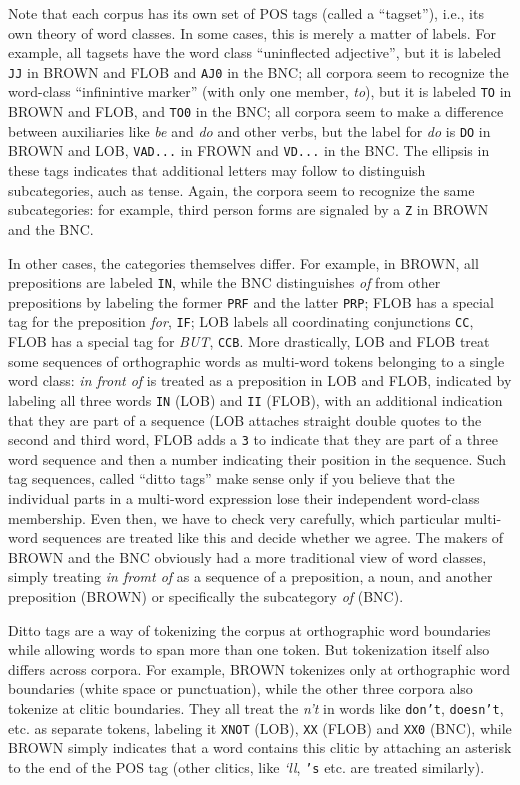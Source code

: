 Note that each corpus has its own set of POS tags (called a ``tagset''), i.e., its own theory of word classes. In some cases, this is merely a matter of labels. For example, all tagsets have the word class ``uninflected adjective'', but it is labeled \texttt{JJ} in BROWN and FLOB and \texttt{AJ0} in the BNC; all corpora seem to recognize the word-class ``infinintive marker'' (with only one member, \textit{to}), but it is labeled \texttt{TO} in BROWN and FLOB, and \texttt{TO0} in the BNC; all corpora seem to make a difference between auxiliaries like \textit{be} and \textit{do} and other verbs, but the label for \textit{do} is \texttt{DO} in BROWN and LOB, \texttt{VAD...} in FROWN and \texttt{VD...} in the BNC. The ellipsis in these tags indicates that additional letters may follow to distinguish subcategories, auch as tense. Again, the corpora seem to recognize the same subcategories: for example, third person forms are signaled by a \texttt{Z} in BROWN and the BNC.

In other cases, the categories themselves differ. For example, in BROWN, all prepositions are labeled \texttt{IN}, while the BNC distinguishes \textit{of} from other prepositions by labeling the former \texttt{PRF} and the latter \texttt{PRP}; FLOB has a special tag for the preposition \textit{for}, \texttt{IF}; LOB labels all coordinating conjunctions \texttt{CC}, FLOB has a special tag for \textit{BUT}, \texttt{CCB}. More drastically, LOB and FLOB treat some sequences of orthographic words as multi-word tokens belonging to a single word class: \textit{in front of} is treated as a preposition in LOB and FLOB, indicated by labeling all three words \texttt{IN} (LOB) and \texttt{II} (FLOB), with an additional indication that they are part of a sequence (LOB attaches straight double quotes to the second and third word, FLOB adds a \texttt{3} to indicate that they are part of a three word sequence and then a number indicating their position in the sequence. Such tag sequences, called ``ditto tags'' make sense only if you believe that the individual parts in a multi-word expression lose their independent word-class membership. Even then, we have to check very carefully, which particular multi-word sequences are treated like this and decide whether we agree. The makers of BROWN and the BNC obviously had a more traditional view of word classes, simply treating \textit{in fromt of} as a sequence of a preposition, a noun, and another preposition (BROWN) or specifically the subcategory \textit{of} (BNC).

Ditto tags are a way of tokenizing the corpus at orthographic word boundaries while allowing words to span more than one token. But tokenization itself also differs across corpora. For example, BROWN tokenizes only at orthographic word boundaries (white space or punctuation), while the other three corpora also tokenize at clitic boundaries. They all treat the \textit{n't} in words like \texttt{don't}, \texttt{doesn't}, etc. as separate tokens, labeling it \texttt{XNOT} (LOB), \texttt{XX} (FLOB) and \texttt{XX0} (BNC), while BROWN simply indicates that a word contains this clitic by attaching an asterisk to the end of the POS tag (other clitics, like \textit{‘ll}, \texttt{'s} etc. are treated similarly).

